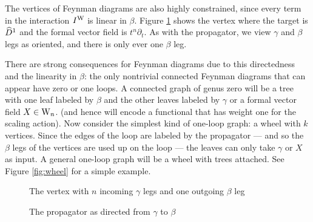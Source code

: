 The vertices of Feynman diagrams are also highly constrained, 
since every term in the interaction $I^{\rm W}$ is linear in $\beta$.
Figure \ref{fig:vertex} shows the vertex where the target is $\widehat{D}^1$ 
and the formal vector field is $t^n \partial_t$. 
As with the propagator, we view $\gamma$ and $\beta$ legs as oriented, 
and there is only ever one $\beta$ leg.

There are strong consequences for Feynman diagrams
due to this directedness and the linearity in $\beta$:
the only nontrivial connected Feynman diagrams that can appear have zero or one loops.
A connected graph of genus zero will be a tree with one leaf labeled by $\beta$ and 
the other leaves labeled by $\gamma$ or a formal vector field $X \in {{\rm W}_n}$.
(and hence will encode a functional that has weight one for the scaling action).
Now consider the simplest kind of one-loop graph: a wheel with $k$ vertices.
Since the edges of the loop are labeled by the propagator --- and 
so the $\beta$ legs of the vertices are used up on the loop --- the leaves can only take $\gamma$ or $X$ as input.
A general one-loop graph will be a wheel with trees attached.
See Figure \ref{fig:wheel} for a simple example.

\begin{figure}
\caption{The vertex with $n$ incoming $\gamma$ legs and one outgoing $\beta$ leg}
\label{fig:vertex}
\end{figure}

\begin{figure}
\caption{The propagator as directed from $\gamma$ to $\beta$}
\label{fig:prop}
\end{figure}

